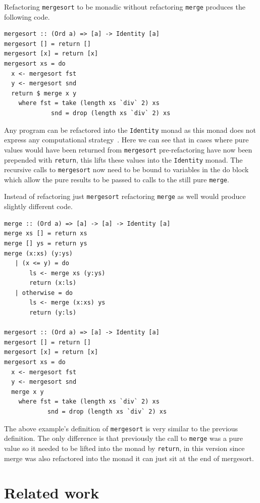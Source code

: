 Refactoring \texttt{mergesort} to be monadic without refactoring \texttt{merge} produces the following code.

\begin{lstlisting}[frame=tblr]
mergesort :: (Ord a) => [a] -> Identity [a]
mergesort [] = return []
mergesort [x] = return [x]
mergesort xs = do
  x <- mergesort fst
  y <- mergesort snd
  return $ merge x y
    where fst = take (length xs `div` 2) xs
             snd = drop (length xs `div` 2) xs
\end{lstlisting}  

Any program can be refactored into the \texttt{Identity} monad as this monad does not express any computational strategy~\citep{identityMonad}. Here we can see that in cases where pure values would have been returned from \texttt{mergesort} pre-refactoring have now been prepended with \texttt{return}, this lifts these values into the \texttt{Identity} monad. The recursive calls to \texttt{mergesort} now need to be bound to variables in the do block which allow the pure results to be passed to calls to the still pure \texttt{merge}.

Instead of refactoring just \texttt{mergesort} refactoring \texttt{merge} as well would produce slightly different code.

\begin{lstlisting}[frame = tblr]
merge :: (Ord a) => [a] -> [a] -> Identity [a]
merge xs [] = return xs
merge [] ys = return ys
merge (x:xs) (y:ys)
   | (x <= y) = do
       ls <- merge xs (y:ys)
       return (x:ls)
   | otherwise = do
       ls <- merge (x:xs) ys
       return (y:ls)

mergesort :: (Ord a) => [a] -> Identity [a]
mergesort [] = return []
mergesort [x] = return [x]
mergesort xs = do
  x <- mergesort fst
  y <- mergesort snd
  merge x y
    where fst = take (length xs `div` 2) xs
            snd = drop (length xs `div` 2) xs
\end{lstlisting}

The above example's definition of \texttt{mergesort} is very similar to the previous definition. The only difference is that previously the call to \texttt{merge} was a pure value so it needed to be lifted into the monad by \texttt{return}, in this version since merge was also refactored into the monad it can just sit at the end of mergesort.

\fi 
\chapter{Related work}

